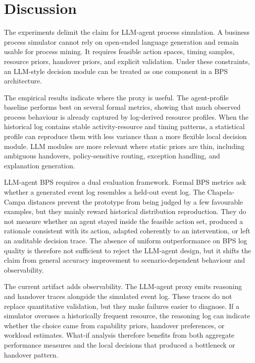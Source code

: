 \section{Discussion}\label{discussion}

The experiments delimit the claim for LLM-agent process simulation. A
business process simulator cannot rely on open-ended language generation
and remain usable for process mining. It requires feasible action
spaces, timing samples, resource priors, handover priors, and explicit
validation. Under these constraints, an LLM-style decision module can be
treated as one component in a BPS architecture.

The empirical results indicate where the proxy is useful. The
agent-profile baseline performs best on several formal metrics, showing
that much observed process behaviour is already captured by log-derived
resource profiles. When the historical log contains stable
activity-resource and timing patterns, a statistical profile can
reproduce them with less variance than a more flexible local decision
module. LLM modules are more relevant where static priors are thin,
including ambiguous handovers, policy-sensitive routing, exception
handling, and explanation generation.

LLM-agent BPS requires a dual evaluation framework. Formal BPS metrics
ask whether a generated event log resembles a held-out event log. The
Chapela-Campa distances prevent the prototype from being judged by a few
favourable examples, but they mainly reward historical distribution
reproduction. They do not measure whether an agent stayed inside the
feasible action set, produced a rationale consistent with its action,
adapted coherently to an intervention, or left an auditable decision
trace. The absence of uniform outperformance on BPS log quality is
therefore not sufficient to reject the LLM-agent design, but it shifts
the claim from general accuracy improvement to scenario-dependent
behaviour and observability.

The current artifact adds observability. The LLM-agent proxy emits
reasoning and handover traces alongside the simulated event log. These
traces do not replace quantitative validation, but they make failures
easier to diagnose. If a simulator overuses a historically frequent
resource, the reasoning log can indicate whether the choice came from
capability priors, handover preferences, or workload estimates. What-if
analysis therefore benefits from both aggregate performance measures and
the local decisions that produced a bottleneck or handover pattern.

